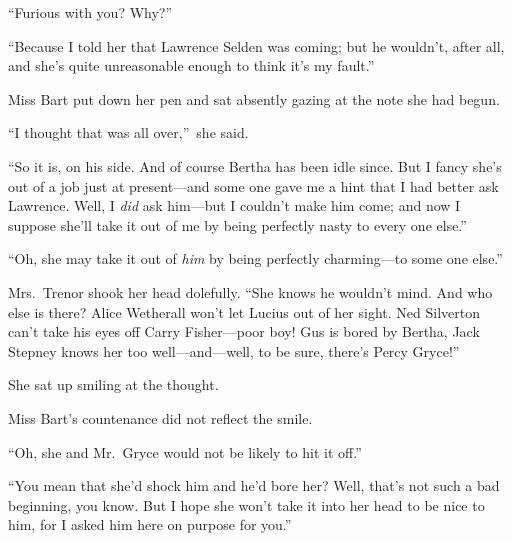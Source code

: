 \documentclass[12pt,a4paper]{book}
\begin{document}
``Furious with you? Why?''





``Because I told her that Lawrence Selden was coming; but he
wouldn't, after all, and she's quite unreasonable enough to think
it's my fault.''





Miss Bart put down her pen and sat absently gazing at the note
she had begun.





``I thought that was all over,''\ she said.





``So it is, on his side. And of course Bertha has been idle since. 
But I fancy she's out of a job just at present---and some one gave
me a hint that I had better ask Lawrence. Well, I \textit{did} ask
him---but I couldn't make him come; and now I suppose she'll take
it out of me by being perfectly nasty to every one else.''





``Oh, she may take it out of \textit{him} by being perfectly charming---to
some one else.''





Mrs.\ Trenor shook her head dolefully. ``She knows he wouldn't
mind. And who else is there? Alice Wetherall won't let Lucius out
of her sight. Ned Silverton can't take his eyes off Carry
Fisher---poor boy! Gus is bored by Bertha, Jack Stepney knows her
too well---and---well, to be sure, there's Percy Gryce!''





She sat up smiling at the thought.





Miss Bart's countenance did not reflect the smile.





``Oh, she and Mr.\ Gryce would not be likely to hit it off.''





``You mean that she'd shock him and he'd bore her? Well, that's
not such a bad beginning, you know. But I hope she won't take it
into her head to be nice to him, for I asked him here on purpose
for you.''
\end{document}
